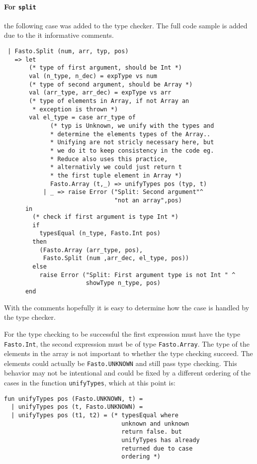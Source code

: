 \documentclass[11pt,a4paper]{article}
\begin{document}
\paragraph{For \texttt{split}} the following case was added to the type checker. The full
code sample is added due to the it informative comments.
\begin{lstlisting}
 | Fasto.Split (num, arr, typ, pos)
   => let
       (* type of first argument, should be Int *)
       val (n_type, n_dec) = expType vs num
       (* type of second argument, should be Array *)
       val (arr_type, arr_dec) = expType vs arr
       (* type of elements in Array, if not Array an 
        * exception is thrown *)
       val el_type = case arr_type of
             (* typ is Unknown, we unify with the types and
             * determine the elements types of the Array..
             * Unifying are not stricly necessary here, but
             * we do it to keep consistency in the code eg.
             * Reduce also uses this practice,
             * alternativly we could just return t
             * the first tuple element in Array *)
             Fasto.Array (t,_) => unifyTypes pos (typ, t)
           | _ => raise Error ("Split: Second argument"^
                               "not an array",pos)
      in
        (* check if first argument is type Int *)
        if
          typesEqual (n_type, Fasto.Int pos)
        then
          (Fasto.Array (arr_type, pos),
           Fasto.Split (num ,arr_dec, el_type, pos))
        else
          raise Error ("Split: First argument type is not Int " ^
                       showType n_type, pos)
      end
\end{lstlisting}
With the comments hopefully it is easy to determine how the case is handled
by the type checker.

For the type checking to be successful the first expression must have
the type \texttt{Fasto.Int}, the second expression must be of type
\texttt{Fasto.Array}. The type of the elements in the array is not
important to whether the type checking succeed. The elements could actually be
\texttt{Fasto.UNKNOWN} and still pass type checking. This behavior may not be
intentional and could be fixed by a different ordering of the cases in
the function \texttt{unifyTypes}, which at this point is:
\begin{lstlisting}
fun unifyTypes pos (Fasto.UNKNOWN, t) =
  | unifyTypes pos (t, Fasto.UNKNOWN) =
  | unifyTypes pos (t1, t2) = (* typesEqual where
                                 unknown and unknown
                                 return false. but
                                 unifyTypes has already
                                 returned due to case
                                 ordering *)
\end{lstlisting}
\end{document}
